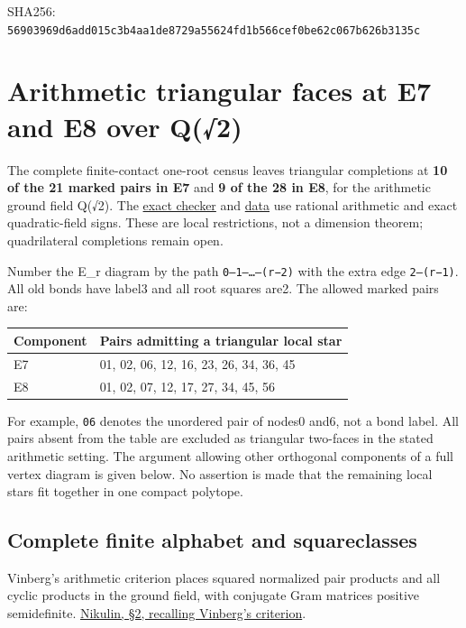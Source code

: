 \documentclass[
  10pt,
]{report}
\newcounter{none} %
\begin{document}
SHA256:
\nolinkurl{56903969d6add015c3b4aa1de8729a55624fd1b566cef0be62c067b626b3135c}

\chapter{Arithmetic triangular faces at E7 and E8 over
Q(√2)}\label{arithmetic-triangular-faces-at-e7-and-e8-over-q2}

The complete finite-contact one-root census leaves triangular
completions at \textbf{10 of the 21 marked pairs in E7} and \textbf{9 of
the 28 in E8}, for the arithmetic ground field Q(√2). The
\href{../scripts/fresh_arithmetic_sqrt2_local_20261015.py}{exact
checker} and \href{fresh_arithmetic_sqrt2_local_20261015.json}{data} use
rational arithmetic and exact quadratic-field signs. These are local
restrictions, not a dimension theorem; quadrilateral completions remain
open.

Number the E\_r diagram by the path \texttt{0—1—…—(r−2)} with the extra
edge \texttt{2—(r−1)}. All old bonds have label3 and all root squares
are2. The allowed marked pairs are:

{\def\LTcaptype{none} %
\begin{longtable}[]{@{}ll@{}}
\toprule\noalign{}
Component & Pairs admitting a triangular local star \\
\midrule\noalign{}
\endhead
\bottomrule\noalign{}
\endlastfoot
E7 & 01, 02, 06, 12, 16, 23, 26, 34, 36, 45 \\
E8 & 01, 02, 07, 12, 17, 27, 34, 45, 56 \\
\end{longtable}
}

For example, \texttt{06} denotes the unordered pair of nodes0 and6, not
a bond label. All pairs absent from the table are excluded as triangular
two-faces in the stated arithmetic setting. The argument allowing other
orthogonal components of a full vertex diagram is given below. No
assertion is made that the remaining local stars fit together in one
compact polytope.

\section{Complete finite alphabet and
squareclasses}\label{complete-finite-alphabet-and-squareclasses}

Vinberg's arithmetic criterion places squared normalized pair products
and all cyclic products in the ground field, with conjugate Gram
matrices positive semidefinite.
\href{https://arxiv.org/pdf/0708.3991}{Nikulin, §2, recalling Vinberg's
criterion}.
\end{document}
